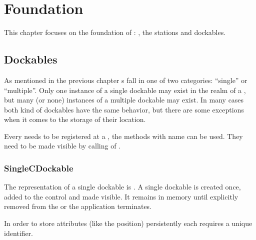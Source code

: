\section{Foundation}
This chapter focuses on the foundation of : , the stations and dockables.

\subsection{Dockables}
As mentioned in the previous chapter s fall in one of two categories: ``single'' or ``multiple''. Only one instance of a single dockable may exist in the realm of a , but many (or none) instances of a multiple dockable may exist. In many cases both kind of dockables have the same behavior, but there are some exceptions when it comes to the storage of their location.

Every  needs to be registered at a , the methods with name  can be used. They need to be made visible by calling  of .



\subsubsection{SingleCDockable}
The representation of a single dockable is . A single dockable is created once, added to the control and made visible. It remains in memory until explicitly removed from the  or the application terminates.

In order to store attributes (like the position) persistently each \linebreak {} requires a unique identifier.

